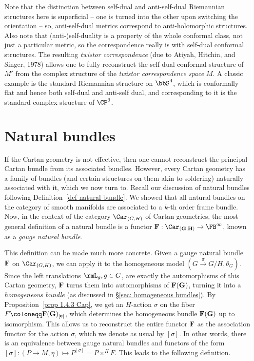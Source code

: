 \begin{example}
    Note that the distinction between self-dual and anti-self-dual Riemannian structures here is superficial -- one is turned into the other upon switching the orientation -- so, anti-self-dual metrics correspond to anti-holomorphic structures. Also note that (anti-)self-duality is a property of the whole conformal class, not just a particular metric, so the correspondence really is with self-dual conformal structures. The resulting \emph{twistor correspondence} (due to Atiyah, Hitchin, and Singer, 1978) allows one to fully reconstruct the self-dual conformal structure of $M'$ from the complex structure of the \emph{twistor correspondence space} $M$. A classic example is the standard Riemannian structure on $\bbS^4$, which is conformally flat and hence both self-dual and anti-self dual, and corresponding to it is the standard complex structure of $\CP^3$.
\end{example}






\section{Natural bundles}\label{sec: natural bundles}



If the Cartan geometry is not effective, then one cannot reconstruct the principal Cartan bundle from its associated bundles. However, every Cartan geometry has a family of bundles (and certain structures on them akin to soldering) naturally associated with it, which we now turn to. Recall our discussion of natural bundles following Definition~\ref{def natural bundle}. We showed that all natural bundles on the category of smooth manifolds are associated to a $k$-th order frame bundle. Now, in the context of the category $\Car_{(G,H)}$ of Cartan geometries, the most general definition of a natural bundle is a functor $\bf{F}:\Car_{(G,H)}\to \FB^\infty$, known as a \emph{gauge natural bundle}. 

This definition can be made much more concrete. Given a gauge natural bundle $\bf{F}$ on $\Car_{(G,H)}$, we can apply it to the homogeneous model $(G\overset{\pi}{\to} G\slash H,\theta_G)$. Since the left translations $\rmL_g,g\in G$, are exactly the automorphisms of this Cartan geometry, $\bf{F}$ turns them into automorphisms of $\bf{F}(G)$, turning it into a \emph{homogeneous bundle} (as discussed in \S\ref{sec: homogeneous bundles}). By Proposition~\ref{prop 1.4.3 Cap}, we get an $H$-action $\sigma$ on the fiber $F\coloneqq \bf{F}(G)_{[e]}$, which determines the homogeneous bundle $\bf{F}(G)$ up to isomorphism. This allows us to reconstruct the entire functor $\bf{F}$ as the association functor for the action $\sigma$, which we denote as usual by $[\sigma]$. In other words, there is an equivalence between gauge natural bundles and functors of the form $[\sigma]:(P\to M,\eta)\mapsto P^{[\sigma]}=P\times^H F$. This leads to the following definition.

